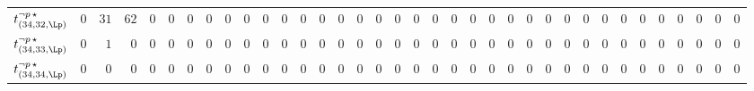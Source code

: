 \begin{tabular}{r|rrrrrrrrrrrrrrrrrrrrrrrrrrrrrrrrrrr}
  $t^{\neg p \, \star}_{(34,32,\Lp)}$ & $0$ & $31$ & $62$ & $0$ & $0$ & $0$ & $0$ & $0$ & $0$ & $0$ & $0$ & $0$ & $0$ & $0$ & $0$ & $0$ & $0$ & $0$ & $0$ & $0$ & $0$ & $0$ & $0$ & $0$ & $0$ & $0$ & $0$ & $0$ & $0$ & $0$ & $0$ & $0$ & $0$ & $0$ & $0$ \\
  $t^{\neg p \, \star}_{(34,33,\Lp)}$ & $0$ & $1$ & $0$ & $0$ & $0$ & $0$ & $0$ & $0$ & $0$ & $0$ & $0$ & $0$ & $0$ & $0$ & $0$ & $0$ & $0$ & $0$ & $0$ & $0$ & $0$ & $0$ & $0$ & $0$ & $0$ & $0$ & $0$ & $0$ & $0$ & $0$ & $0$ & $0$ & $0$ & $0$ & $0$ \\
  $t^{\neg p \, \star}_{(34,34,\Lp)}$ & $0$ & $0$ & $0$ & $0$ & $0$ & $0$ & $0$ & $0$ & $0$ & $0$ & $0$ & $0$ & $0$ & $0$ & $0$ & $0$ & $0$ & $0$ & $0$ & $0$ & $0$ & $0$ & $0$ & $0$ & $0$ & $0$ & $0$ & $0$ & $0$ & $0$ & $0$ & $0$ & $0$ & $0$ & $0$ \\
\end{tabular}

